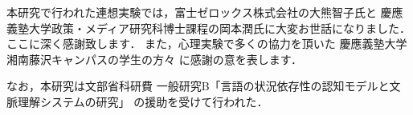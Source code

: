 \medskip
\acknowledgment

本研究で行われた連想実験では，富士ゼロックス株式会社の大熊智子氏と
慶應義塾大学政策・メディア研究科博士課程の岡本潤氏に大変お世話になりました．
ここに深く感謝致します．
また，心理実験で多くの協力を頂いた
慶應義塾大学湘南藤沢キャンパスの学生の方々
に感謝の意を表します．

なお，本研究は文部省科研費
一般研究B「言語の状況依存性の認知モデルと文脈理解システムの研究」
の援助を受けて行われた．




\nocite{ImaiAndIshizaki1996}
\nocite{Ishizaki1996}
\nocite{SuwaAndIwayama1993}





\begin{biography}


\end{biography}


